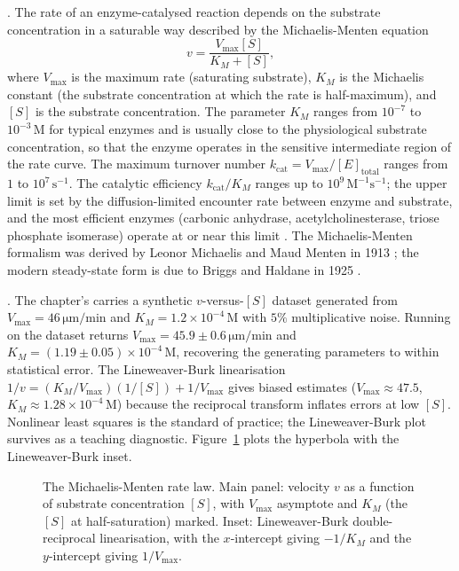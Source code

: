 . The rate of an enzyme-catalysed
reaction depends on the substrate concentration in a saturable way
described by the Michaelis-Menten equation
\[
v = \frac{V_{\max} [S]}{K_M + [S]},
\]
where $V_{\max}$ is the maximum rate (saturating substrate), $K_M$
is the Michaelis constant (the substrate concentration at which the
rate is half-maximum), and $[S]$ is the substrate concentration. The
parameter $K_M$ ranges from $10^{-7}$ to $10^{-3}\,\text{M}$ for
typical enzymes and is usually close to the physiological substrate
concentration, so that the enzyme operates in the sensitive
intermediate region of the rate curve. The maximum turnover number
$k_{\text{cat}} = V_{\max} / [E]_{\text{total}}$ ranges from $1$ to
$10^7\,\text{s}^{-1}$. The catalytic efficiency
$k_{\text{cat}}/K_M$ ranges up to $10^9\,\text{M}^{-1}\text{s}^{-1}$;
the upper limit is set by the diffusion-limited encounter rate
between enzyme and substrate, and the most efficient enzymes
(carbonic anhydrase, acetylcholinesterase, triose phosphate isomerase)
operate at or near this limit \cite[ch.~6]{text:lehninger-biochemistry}.
The Michaelis-Menten formalism was derived by Leonor Michaelis and
Maud Menten in 1913 \cite{paper:michaelis-menten1913,paper:v6c04-michaelis-menten-1913};
the modern steady-state form is due to Briggs and Haldane in 1925
\cite{paper:v6c04-briggs-haldane-1925}.

. The chapter's
 carries a synthetic
$v$-versus-$[S]$ dataset generated from $V_{\max} = 46\,\si{\micro\meter}/\text{min}$
and $K_M = 1.2 \times 10^{-4}\,\text{M}$ with $5\%$ multiplicative noise.
Running  on the dataset returns
$V_{\max} = 45.9 \pm 0.6\,\si{\micro\meter}/\text{min}$ and
$K_M = (1.19 \pm 0.05) \times 10^{-4}\,\text{M}$, recovering the
generating parameters to within statistical error. The
Lineweaver-Burk linearisation $1/v = (K_M/V_{\max})(1/[S]) + 1/V_{\max}$
gives biased estimates ($V_{\max} \approx 47.5$, $K_M \approx 1.28
\times 10^{-4}\,\text{M}$) because the reciprocal transform inflates
errors at low $[S]$. Nonlinear least squares is the standard of
practice; the Lineweaver-Burk plot survives as a teaching diagnostic.
Figure~\ref{fig:v6c04-mm} plots the hyperbola with the
Lineweaver-Burk inset.

\begin{figure}[ht]
\centering

\caption{The Michaelis-Menten rate law. Main panel: velocity $v$ as
a function of substrate concentration $[S]$, with $V_{\max}$
asymptote and $K_M$ (the $[S]$ at half-saturation) marked. Inset:
Lineweaver-Burk double-reciprocal linearisation, with the
$x$-intercept giving $-1/K_M$ and the $y$-intercept giving
$1/V_{\max}$.}
\label{fig:v6c04-mm}
\end{figure}


